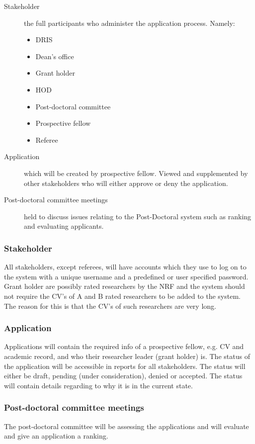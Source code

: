 \documentclass[12pt]{article}
\begin{document}
\begin{description}
\item[Stakeholder] the full participants who administer the application process. Namely:
\begin{itemize}
\item DRIS
\item Dean's office
\item Grant holder
\item HOD
\item Post-doctoral committee
\item Prospective fellow
\item Referee
\end{itemize}
\item[Application] which will be created by prospective fellow. Viewed and supplemented by other stakeholders who will either approve or deny the application.
\item[Post-doctoral committee meetings] held to discuss issues relating to the Post-Doctoral system such as ranking and evaluating applicants.
\end{description}
\vspace{0.5in}
\subsubsection{Stakeholder}
All stakeholders, except referees, will have accounts which they use to log on to the system with a unique username and a predefined or user specified password.\linebreak \linebreak
Grant holder are possibly rated researchers by the NRF and the system should not require the CV's of A and B rated researchers to be added to the system. The reason for this is that the CV's of such researchers are very long.
\subsubsection{Application}
Applications will contain the required info of a prospective fellow, e.g. CV and academic record, and who their researcher leader (grant holder) is. The status of the application will be accessible in reports for all stakeholders. The status will either be draft, pending (under consideration), denied or accepted. The status will contain details regarding to why it is in the current state.
\subsubsection{Post-doctoral committee meetings}
The post-doctoral committee will be assessing the applications and will evaluate and give an application a ranking.
\end{document}
